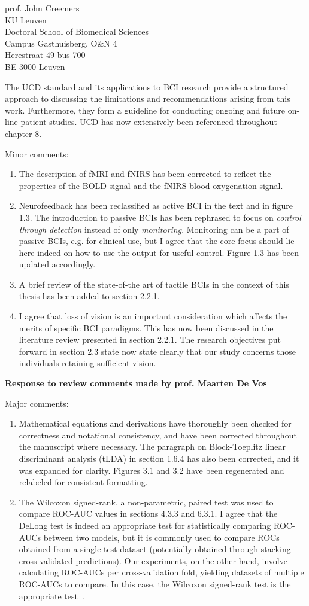 \documentclass{letter}
\newcommand{\reply}[1]{%
	\textbf{Response to review comments made by prof. #1}

}
\begin{document}
\begin{letter}{%
	prof. John Creemers \\
	KU Leuven \\
	Doctoral School of Biomedical Sciences \\
	Campus Gasthuisberg, O\&N 4 \\
	Herestraat 49 bus 700 \\
	BE-3000 Leuven

}
\begin{enumerate}
    The UCD standard and its applications to BCI research provide a structured
    approach to discussing the limitations and recommendations arising from this
    work.
    Furthermore, they form a guideline for conducting ongoing and future on-line patient
    studies.
    UCD has now extensively been referenced throughout chapter 8.
\end{enumerate}
Minor comments:
\begin{enumerate}
  \item The description of fMRI and fNIRS has been
    corrected to reflect the properties of the BOLD signal and the fNIRS blood
    oxygenation signal.
  \item	Neurofeedback has been reclassified as active BCI in the text and in
	  figure 1.3.
    The introduction to passive BCIs has been rephrased to focus on
    \emph{control through detection} instead of only \emph{monitoring}.
    Monitoring can be a part of passive BCIs, e.g. for clinical use, but I
    agree that the core focus should lie here indeed on how to use the output
    for useful control.
    Figure 1.3 has been updated accordingly.
  \item A brief review of the state-of-the art of tactile BCIs in the
    context of this thesis has been added to section 2.2.1.
  \item I agree that loss of vision is an important consideration which affects
    the merits of specific BCI paradigms. This has now been discussed in the
    literature review presented in section 2.2.1. The research objectives
    put forward in section 2.3 state now state clearly that our study concerns
    those individuals retaining sufficient vision.
\end{enumerate}

\reply{Maarten De Vos}
Major comments:
\begin{enumerate}
	\item Mathematical equations and derivations have thoroughly
	been checked for correctness and notational consistency, and have been
	corrected throughout the manuscript where necessary.
	The paragraph on Block-Toeplitz linear discriminant analysis (tLDA) in
	section 1.6.4 has also been corrected, and it was expanded for clarity.
	Figures 3.1 and 3.2 have been regenerated and relabeled for consistent
	formatting.
	\item The Wilcoxon signed-rank, a non-parametric,
    paired test was used to compare ROC-AUC values in sections 4.3.3 and 6.3.1.
    I agree that the DeLong test is indeed an appropriate test for
    statistically comparing ROC-AUCs between two models, but it is commonly used
    to compare ROCs obtained from a single test dataset (potentially obtained
    through stacking cross-validated predictions).
    Our experiments, on the other hand, involve calculating ROC-AUCs per
    cross-validation fold, yielding datasets of multiple ROC-AUCs to compare.
    In this case, the Wilcoxon signed-rank test is the appropriate
    test~\cite{Rainio2024}.


\end{enumerate}
\end{letter}
\end{document}
